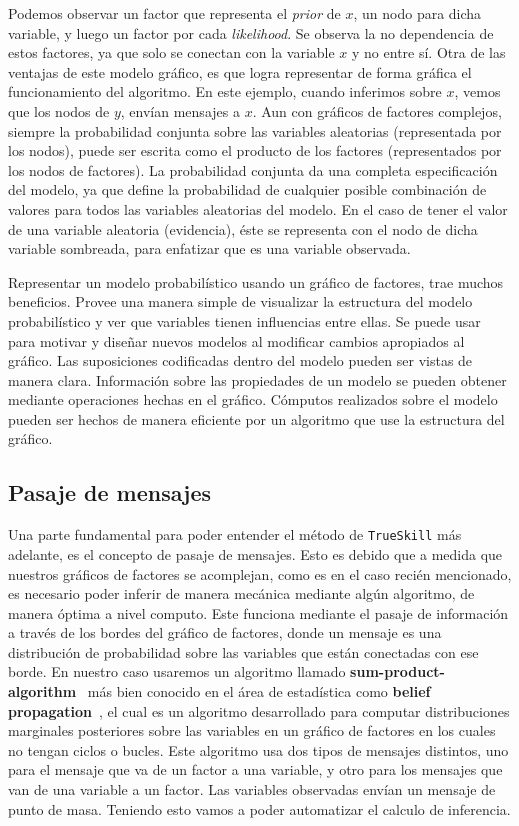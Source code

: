 \documentclass[11pt,twoside, spanish]{report} %
\begin{document}
Podemos observar un factor que representa el \textit{prior} de $x$, un nodo para dicha variable, y luego un factor por cada \emph{likelihood}.
Se observa la no dependencia de estos factores, ya que solo se conectan con la variable $x$ y no entre s\'i.
Otra de las ventajas de este modelo gr\'afico, es que logra representar de forma gr\'afica el funcionamiento  del algoritmo.
En este ejemplo, cuando inferimos sobre $x$, vemos que los nodos de $y$, env\'ian mensajes a $x$.
Aun con gr\'aficos de factores complejos, siempre la probabilidad conjunta sobre las variables aleatorias (representada por los nodos), puede ser escrita como el producto de los factores (representados por los nodos de factores).
La probabilidad conjunta da una completa especificaci\'on del modelo, ya que define la probabilidad de cualquier posible combinaci\'on de valores para todos las variables aleatorias del modelo.
En el caso de tener el valor de una variable aleatoria (evidencia), \'este se representa con el nodo de dicha variable sombreada, para enfatizar que es una variable observada.

Representar un modelo probabil\'istico usando un gr\'afico de factores, trae muchos beneficios.
Provee una manera simple de visualizar la estructura del modelo probabil\'istico y ver que variables tienen influencias entre ellas.
Se puede usar para motivar y dise\~nar nuevos modelos al modificar cambios apropiados al gr\'afico.
Las suposiciones codificadas dentro del modelo pueden ser vistas de manera clara.
Informaci\'on sobre las propiedades de un modelo se pueden obtener mediante operaciones hechas en el gr\'afico.
C\'omputos realizados sobre el modelo pueden ser hechos de manera eficiente por un algoritmo que use la estructura del gr\'afico.



\subsection{Pasaje de mensajes}

Una parte fundamental para poder entender el m\'etodo de \texttt{TrueSkill} m\'as adelante, es el concepto de pasaje de mensajes.
Esto es debido que a medida que nuestros gr\'aficos de factores se acomplejan, como es en el caso reci\'en mencionado, es necesario poder inferir de manera mec\'anica mediante alg\'un algoritmo, de manera \'optima a nivel computo.
Este funciona mediante el pasaje de informaci\'on a trav\'es de los bordes del gr\'afico de factores, donde un mensaje es una distribuci\'on de probabilidad sobre las variables que est\'an conectadas con ese borde.
En nuestro caso usaremos un algoritmo llamado \textbf{sum-product-algorithm}~\cite{Kschischang2001} m\'as bien conocido en el \'area de estad\'istica como \textbf{belief propagation}~\cite{pearl1986-beliefNetworks}, el cual es un algoritmo desarrollado para computar distribuciones marginales posteriores sobre las variables en un gr\'afico de factores en los cuales no tengan ciclos o bucles.
Este algoritmo usa dos tipos de mensajes distintos, uno para el mensaje que va de un factor a una variable,  y otro para los mensajes que van de una variable a un factor.
Las variables observadas env\'ian un mensaje de punto de masa.
Teniendo esto vamos a poder automatizar el calculo de inferencia.
\end{document}
